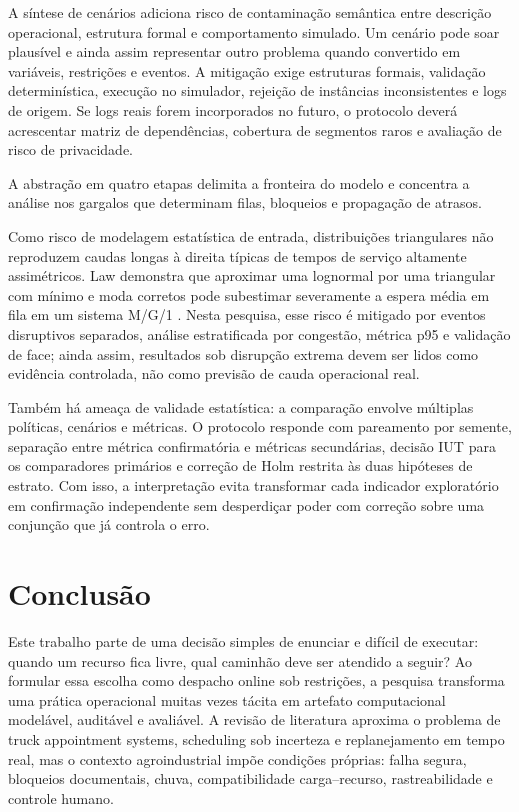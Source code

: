 \documentclass[
  12pt,
  oneside,
  a4paper,
  sumario=tradicional,
  brazil
]{abntex2}
\begin{document}
A s\'intese de cen\'arios adiciona risco de contamina\c{c}\~ao sem\^antica entre descri\c{c}\~ao operacional, estrutura formal e comportamento simulado. Um cen\'ario pode soar plaus\'ivel e ainda assim representar outro problema quando convertido em vari\'aveis, restri\c{c}\~oes e eventos. A mitiga\c{c}\~ao exige estruturas formais, valida\c{c}\~ao determin\'istica, execu\c{c}\~ao no simulador, rejei\c{c}\~ao de inst\^ancias inconsistentes e logs de origem. Se logs reais forem incorporados no futuro, o protocolo dever\'a acrescentar matriz de depend\^encias, cobertura de segmentos raros e avalia\c{c}\~ao de risco de privacidade.

A abstra\c{c}\~ao em quatro etapas delimita a fronteira do modelo e concentra a an\'alise nos gargalos que determinam filas, bloqueios e propaga\c{c}\~ao de atrasos.

Como risco de modelagem estat\'istica de entrada, distribui\c{c}\~oes triangulares n\~ao reproduzem caudas longas \`a direita t\'ipicas de tempos de servi\c{c}o altamente assim\'etricos. Law demonstra que aproximar uma lognormal por uma triangular com m\'inimo e moda corretos pode subestimar severamente a espera m\'edia em fila em um sistema M/G/1 \parencite[Ex.~6.23, p.~376--377]{lawSimulationModelingAnalysis2015}. Nesta pesquisa, esse risco \'e mitigado por eventos disruptivos separados, an\'alise estratificada por congest\~ao, m\'etrica p95 e valida\c{c}\~ao de face; ainda assim, resultados sob disrup\c{c}\~ao extrema devem ser lidos como evid\^encia controlada, n\~ao como previs\~ao de cauda operacional real.

Tamb\'em h\'a amea\c{c}a de validade estat\'istica: a compara\c{c}\~ao envolve m\'ultiplas pol\'iticas, cen\'arios e m\'etricas. O protocolo responde com pareamento por semente, separa\c{c}\~ao entre m\'etrica confirmat\'oria e m\'etricas secund\'arias, decis\~ao IUT para os comparadores prim\'arios e corre\c{c}\~ao de Holm restrita \`as duas hip\'oteses de estrato. Com isso, a interpreta\c{c}\~ao evita transformar cada indicador explorat\'orio em confirma\c{c}\~ao independente sem desperdi\c{c}ar poder com corre\c{c}\~ao sobre uma conjun\c{c}\~ao que j\'a controla o erro.

\chapter{Conclusão}\label{ch:conclusao}
Este trabalho parte de uma decis\~ao simples de enunciar e dif\'icil de executar: quando um recurso fica livre, qual caminh\~ao deve ser atendido a seguir? Ao formular essa escolha como despacho online sob restri\c{c}\~oes, a pesquisa transforma uma pr\'atica operacional muitas vezes t\'acita em artefato computacional model\'avel, audit\'avel e avali\'avel. A revis\~ao de literatura aproxima o problema de truck appointment systems, scheduling sob incerteza e replanejamento em tempo real, mas o contexto agroindustrial imp\~oe condi\c{c}\~oes pr\'oprias: falha segura, bloqueios documentais, chuva, compatibilidade carga--recurso, rastreabilidade e controle humano.
\end{document}
